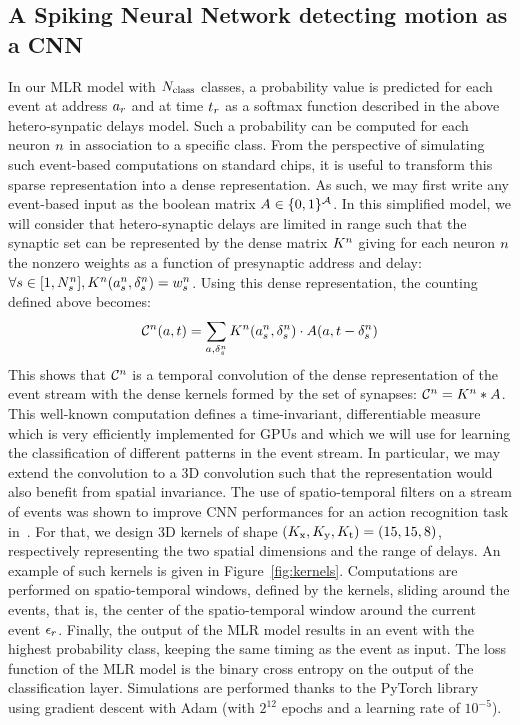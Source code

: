 \documentclass[default]{sn-jnl}%
\theoremstyle{thmstyleone}%
\theoremstyle{thmstyletwo}%
\theoremstyle{thmstylethree}%
\begin{document}
\subsection{A Spiking Neural Network detecting motion as a CNN}
%
In our MLR model with $N_\text{class}$ classes, a probability value is predicted for each event at address $a_r$ and at time $t_r$ as a softmax function described in the above hetero-synpatic delays model. Such a probability can be computed for each neuron $n$ in association to a specific class. 
From the perspective of simulating such event-based computations on standard chips, it is useful to transform this sparse representation into a dense representation. As such, we may first write any event-based input as the boolean matrix $A \in \{0, 1 \}^{\mathcal{A}}$. In this simplified model, we will consider that hetero-synaptic delays are limited in range such that the synaptic set can be represented by the dense matrix $K^n$ giving for each neuron $n$ the nonzero weights as a function of presynaptic address and delay: $\forall {s\in [1,N_{s}^n]}, K^n(a_s^n, \delta_s^n) = w_s^n$. 
Using this dense representation, the counting defined above becomes:
$$
\mathcal{C}^n(a,t)
= \sum_{a, \delta_s^n} K^n(a_s^n, \delta_s^n) \cdot A(a, t-\delta_s^n)
$$
%
This shows that $\mathcal{C}^n$ is a temporal convolution of the dense representation of the event stream with the dense kernels formed by the set of synapses:  $\mathcal{C}^n = K^n \ast A$.
This well-known computation defines a time-invariant, differentiable measure which is very efficiently implemented for GPUs and which we will use for learning the classification of different patterns in the event stream.
%
In particular, we may extend the convolution to a 3D convolution 
such that the representation would also benefit from spatial invariance. The use of spatio-temporal filters on a stream of events was shown to improve CNN performances for an action recognition task in~\citep{ghosh_spatiotemporal_2019}.
For that, we design 3D kernels of shape  $(K_\text{x}, K_\text{y}, K_\text{t}) = (15, 15, 8)$, respectively representing the two spatial dimensions and the range of delays. An example of such kernels is given in Figure~\ref{fig:kernels}.
Computations are performed on spatio-temporal windows, defined by the kernels, sliding around the events, that is, the center of the spatio-temporal window around the current event $\epsilon_r$.
%
Finally, the output of the MLR model results in an event with the highest probability class, keeping the same timing as the event as input.
%
The loss function of the MLR model is the binary cross entropy on the output of the classification layer. Simulations are performed thanks to the PyTorch library using gradient descent with Adam (with $2^{12}$ epochs and a learning rate of $10^{-5}$). 
%
\end{document}
